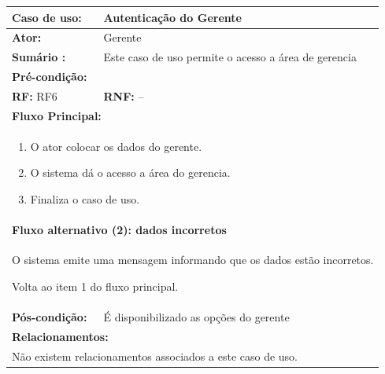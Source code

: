 \documentclass[
	12pt,				%
	openright,
	oneside,			%
	a4paper,			%
	chapter=TITLE,		%
	brazil				%
	]{abntex2}
\begin{document}
\begin{table}[h]
\centering
\begin{tabular}{|p{3cm}|p{3cm}|p{3cm}|p{3cm}|}
\hline
\textbf{Caso de uso:}             & \multicolumn{3}{p{9cm}|}{Autenticação do Gerente}				 \\ \hline
\textbf{Ator:}                 & \multicolumn{3}{p{9cm}|}{Gerente}         			          						 	\\ \hline
\textbf{Sumário :}                & \multicolumn{3}{p{9cm}|}{Este caso de uso permite o acesso a área de gerencia%
																												}         	\\ \hline
\textbf{Pré-condição:}            & \multicolumn{3}{p{9cm}|}{  }                				    \\ \hline
\multicolumn{2}{|p{6cm}|}{\textbf{RF:} RF6 }                  & \multicolumn{2}{p{6cm}|}{\textbf{RNF:} --}     	    \\ \hline
\multicolumn{4}{|p{12cm}|}{\textbf{Fluxo Principal:}}                                                					\\ \hline
\multicolumn{4}{|p{12cm}|}{%
\begin{enumerate}
  \item O ator colocar os dados do gerente.
  \item O sistema dá o acesso a área do gerencia.
  \item Finaliza o caso de uso.
\end{enumerate}}                                                               				 							\\ \hline
\multicolumn{4}{|p{12cm}|}{\textbf{Fluxo alternativo (2): dados incorretos }}            									\\ \hline
\multicolumn{4}{|p{12cm}|}{%
\begin{alineas}
  \item O sistema emite uma mensagem informando que os dados estão incorretos.
  \item Volta ao item 1 do fluxo principal.
\end{alineas}}                                                               				 							\\ \hline
\textbf{Pós-condição: }  & \multicolumn{3}{p{9cm}|}{ É disponibilizado as opções do gerente }		\\ \hline
\multicolumn{4}{|p{12cm}|}{\textbf{Relacionamentos:}}                                        								\\ \hline
\multicolumn{4}{|p{12cm}|}{Não existem relacionamentos associados a este caso de uso.}                                  \\ \hline
\end{tabular}
\end{table}
\end{document}
